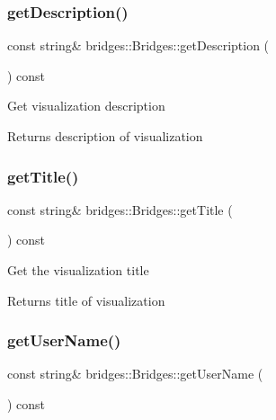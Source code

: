 \subsubsection{\texorpdfstring{getDescription()}{getDescription()}}
{\footnotesize\ttfamily const string\& bridges\+::\+Bridges\+::get\+Description (\begin{DoxyParamCaption}{ }\end{DoxyParamCaption}) const\hspace{0.3cm}{\ttfamily [inline]}}

Get visualization description \begin{DoxyReturn}{Returns}
description of visualization 
\end{DoxyReturn}
\mbox{\label{classbridges_1_1_bridges_a8fe8c79b0f852c0049a699c801e40a61}} 
\subsubsection{\texorpdfstring{getTitle()}{getTitle()}}
{\footnotesize\ttfamily const string\& bridges\+::\+Bridges\+::get\+Title (\begin{DoxyParamCaption}{ }\end{DoxyParamCaption}) const\hspace{0.3cm}{\ttfamily [inline]}}

Get the visualization title

\begin{DoxyReturn}{Returns}
title of visualization 
\end{DoxyReturn}
\mbox{\label{classbridges_1_1_bridges_ad16be2d94936fd555bc05f58c8c21f50}} 
\subsubsection{\texorpdfstring{getUserName()}{getUserName()}}
{\footnotesize\ttfamily const string\& bridges\+::\+Bridges\+::get\+User\+Name (\begin{DoxyParamCaption}{ }\end{DoxyParamCaption}) const\hspace{0.3cm}{\ttfamily [inline]}}

